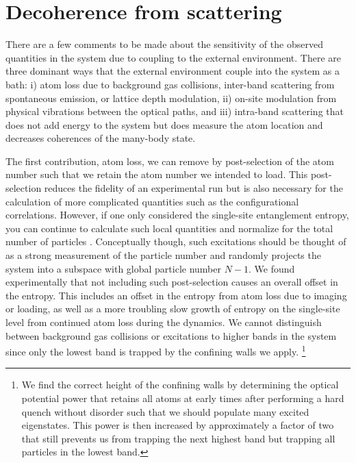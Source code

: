 \section{Decoherence from scattering}
\label{sec:ch5dec}

There are a few comments to be made about the sensitivity of the observed quantities in the system due to coupling to the external environment. There are three dominant ways that the external environment couple into the system as a bath: i) atom loss due to background gas collisions, inter-band scattering from spontaneous emission, or lattice depth modulation, ii) on-site modulation from physical vibrations between the optical paths, and iii) intra-band scattering that does not add energy to the system but does measure the atom location and decreases coherences of the many-body state. 

The first contribution, atom loss, we can remove by post-selection of the atom number such that we retain the atom number we intended to load. This post-selection reduces the fidelity of an experimental run but is also necessary for the calculation of more complicated quantities such as the configurational correlations. However, if one only considered the single-site entanglement entropy, you can continue to calculate such local quantities and normalize for the total number of particles \cite{Schreiber2015,Choi2016}. Conceptually though, such excitations should be thought of as a strong measurement of the particle number and randomly projects the system into a subspace with global particle number $N-1$. We found experimentally that not including such post-selection causes an overall offset in the entropy. This includes an offset in the entropy from atom loss due to imaging or loading, as well as a more troubling slow growth of entropy on the single-site level from continued atom loss during the dynamics. We cannot distinguish between background gas collisions or excitations to higher bands in the system since only the lowest band is trapped by the confining walls we apply. \footnote{We find the correct height of the confining walls by determining the optical potential power that retains all atoms at early times after performing a hard quench without disorder such that we should populate many excited eigenstates. This power is then increased by approximately a factor of two that still prevents us from trapping the next highest band but trapping all particles in the lowest band.}


